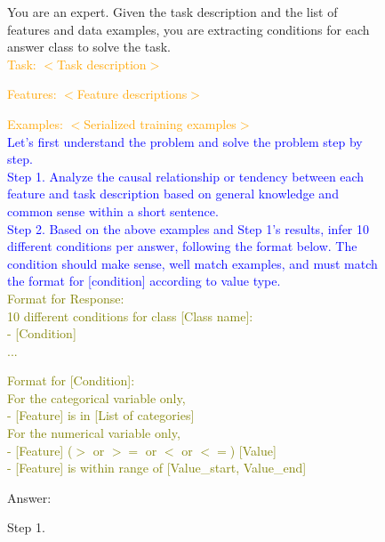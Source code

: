 \begin{figure}[ht]
\begin{tcolorbox}[enhanced,attach boxed title to top center={yshift=-3mm,yshifttext=-1mm},
  colback=black!0!white, colframe=black!20!white, colbacktitle=black!10!white, coltitle=blue!20!black ]
\footnotesize{
You are an expert. Given the task description and the list of features and data examples, you are extracting conditions for each answer class to solve the task. \\

\textcolor{orange}{Task: $<$Task description$>$}

\textcolor{orange}{Features: $<$Feature descriptions$>$}

\textcolor{orange}{Examples: $<$Serialized training examples$>$} \\

\textcolor{blue}{Let's first understand the problem and solve the problem step by step.} \\

\textcolor{blue}{Step 1. Analyze the causal relationship or tendency between each feature and task description based on general knowledge and common sense within a short sentence.} \\

\textcolor{blue}{Step 2. Based on the above examples and Step 1's results, infer 10 different conditions per answer, following the format below. The condition should make sense, well match examples, and must match the format for [condition] according to value type.}\\

\textcolor{olive}{Format for Response: \\
10 different conditions for class [Class name]: \\
- [Condition]   \\
...\\}

\textcolor{olive}{Format for [Condition]: \\
For the categorical variable only, \\
- [Feature] is in [List of categories]\\
For the numerical variable only,\\
- [Feature] ($>$ or $>=$ or $<$ or $<=$) [Value]\\
- [Feature] is within range of [Value\_start, Value\_end]\\}

Answer:

Step 1. 
}
\end{tcolorbox}
\label{fig:prompt_for_rule}            
\end{figure}

